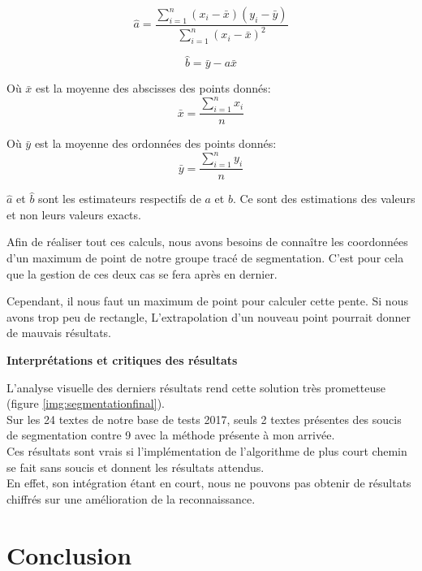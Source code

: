 \documentclass[12pt,a4paper]{article}
\begin{document}
\begin{equation}
\hat{a}=\frac{\sum_{i=1}^{n} (x_{i} - \bar{x})(y_{i} - \bar{y})}{\sum_{i=1}^{n}(x_{i} - \bar{x})^{2}}
\end{equation}

\begin{equation}
\hat{b}=\bar{y} - a\bar{x}
\end{equation}

Où $\bar{x}$ est la moyenne des abscisses des points donnés:
\begin{equation}
\bar{x}=\frac{\sum_{i=1}^{n} x_{i}}{n}
\end{equation}

Où $\bar{y}$ est la moyenne des ordonnées des points donnés:
\begin{equation}
\bar{y}=\frac{\sum_{i=1}^{n} y_{i}}{n}
\end{equation}

$\hat{a}$ et $\hat{b}$ sont les estimateurs respectifs de $a$ et $b$. Ce sont des estimations des valeurs et non leurs valeurs exacts.\bigbreak

Afin de réaliser tout ces calculs, nous avons besoins de connaître les coordonnées d'un maximum de point de notre groupe tracé de segmentation. C'est pour cela que la gestion de ces deux cas se fera après en dernier.



\newpage
Cependant, il nous faut un maximum de point pour calculer cette pente. Si nous avons trop peu de rectangle, L'extrapolation d'un nouveau point pourrait donner de mauvais résultats.\bigbreak

\bigbreak\textbf{Interprétations et critiques des résultats}\bigbreak

L'analyse visuelle des derniers résultats rend cette solution très prometteuse (figure \ref{img:segmentationfinal}).\\
Sur les 24 textes de notre base de tests 2017, seuls 2 textes présentes des soucis de segmentation contre 9 avec la méthode présente à mon arrivée.\\
Ces résultats sont vrais si l'implémentation de l'algorithme de plus court chemin se fait sans soucis et donnent les résultats attendus.\\
En effet, son intégration étant en court, nous ne pouvons pas obtenir de résultats chiffrés sur une amélioration de la reconnaissance.\bigbreak

\newpage
\section{Conclusion}
\end{document}
